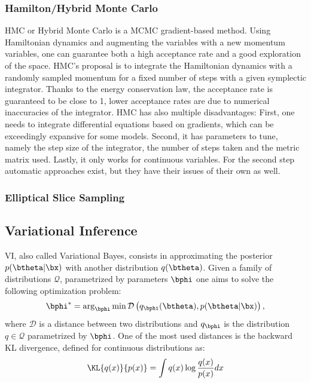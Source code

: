 \subsubsection{Hamilton/Hybrid Monte Carlo}

\acf{HMC} or Hybrid Monte Carlo \cite{betancourt2017conceptual} is a \ac{MCMC} gradient-based method.
Using Hamiltonian dynamics and augmenting the variables with a new momentum variables, one can guarantee both a high acceptance rate and a good exploration of the space.
\ac{HMC}'s proposal is to integrate the Hamiltonian dynamics with a randomly sampled momentum for a fixed number of steps with a given symplectic integrator.
Thanks to the energy conservation law, the acceptance rate is guaranteed to be close to 1, lower acceptance rates are due to numerical inaccuracies of the integrator.
\ac{HMC} has also multiple disadvantages: 
First, one needs to integrate differential equations based on gradients, which can be exceedingly expansive for some models.
Second, it has parameters to tune, namely the step size of the integrator, the number of steps taken and the metric matrix used.
Lastly, it only works for continuous variables.
For the second step automatic approaches exist, but they have their issues of their own as well.


\subsubsection{Elliptical Slice Sampling}



\subsection{Variational Inference}

\acf{VI}, also called Variational Bayes, consists in approximating the posterior $p(\btheta|\bx)$ with another distribution $q(\btheta)$.
Given a family of distributions $\mathcal{Q}$, parametrized by parameters $\bphi$ one aims to solve the following optimization problem:
\begin{align}
\bphi^* = \arg_{\bphi}\min \mathcal{D}\left(q_{\bphi}(\btheta), p(\btheta|\bx)\right),
\label{eq:prob_VI}
\end{align}
where $\mathcal{D}$ is a distance between two distributions and $q_{\bphi}$ is the distribution $q\in \mathcal{Q}$ parametrized by $\bphi$.
One of the most used distances is the backward \ac{KL} divergence, defined for continuous distributions as:
\begin{align}
\KL{q(x)}{p(x)} = \int q(x) \log \frac{q(x)}{p(x)}dx
\label{eq:kl}
\end{align}

